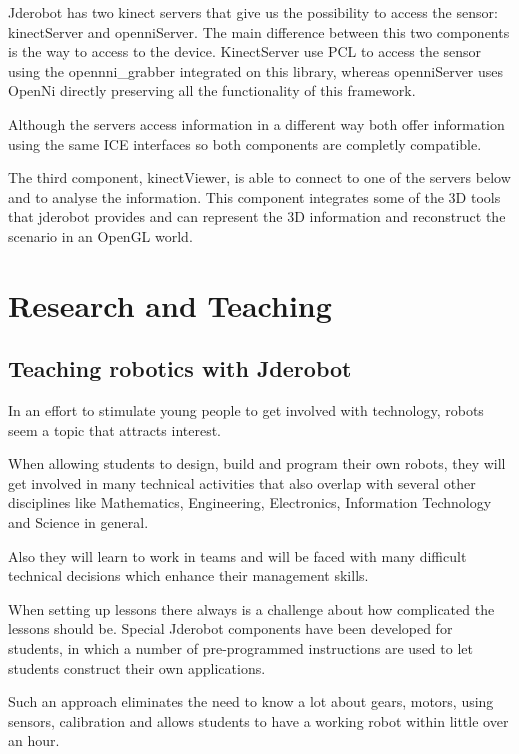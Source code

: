 \documentclass[twocolumn]{svjour3}          %
\begin{document}
Jderobot has two kinect servers that give us the possibility to access the sensor: kinectServer and openniServer. The main difference between this two components is the way to access to the device. KinectServer use PCL to access the sensor using the opennni\_grabber integrated on this library, whereas openniServer uses OpenNi directly preserving all the functionality of this framework. 

Although the servers access information in a different way both offer information using the same ICE interfaces so both components are completly compatible. 

The third component, kinectViewer, is able to connect to one of the servers below and to analyse  the information. This component integrates some of the 3D tools that jderobot provides and can represent the 3D information and reconstruct the scenario in an OpenGL world. 


\section{Research and Teaching}
\label{ref:research}

\subsection{Teaching robotics with Jderobot}

In an effort to stimulate young people to get involved with technology, robots seem a topic that attracts interest.

When allowing students to design, build and program their own robots, they will get involved in many technical activities that also overlap with several other disciplines like Mathematics, Engineering, Electronics, Information Technology and Science in general.

Also they will learn to work in teams and will be faced with many difficult technical decisions which enhance their management skills.

When setting up lessons there always is a challenge about how complicated the lessons should be. Special Jderobot components have been developed for students, in which a number of pre-programmed instructions are used to let students construct their own applications.

Such an approach eliminates the need to know a lot about gears, motors, using sensors, calibration and allows students to have a working robot within little over an hour.
\end{document}
